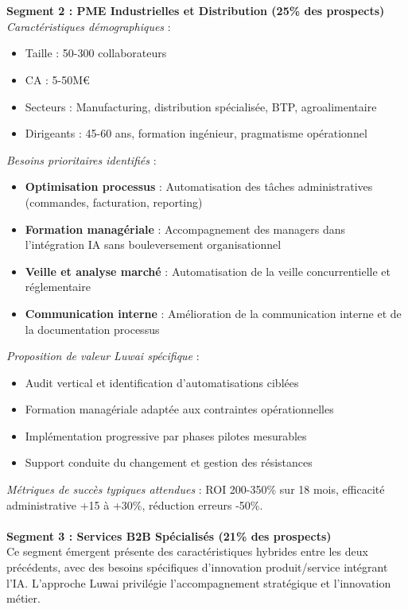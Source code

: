\\\\
\textbf{Segment 2 : PME Industrielles et Distribution (25\% des prospects)}\\
\emph{Caractéristiques démographiques} :
\begin{itemize}
    \item Taille : 50-300 collaborateurs
    \item CA : 5-50M€
    \item Secteurs : Manufacturing, distribution spécialisée, BTP, agroalimentaire
    \item Dirigeants : 45-60 ans, formation ingénieur, pragmatisme opérationnel
\end{itemize}
\medskip
\emph{Besoins prioritaires identifiés} :
\begin{itemize}
    \item \textbf{Optimisation processus} : Automatisation des tâches administratives (commandes, facturation, reporting)
    \item \textbf{Formation managériale} : Accompagnement des managers dans l'intégration IA sans bouleversement organisationnel
    \item \textbf{Veille et analyse marché} : Automatisation de la veille concurrentielle et réglementaire
    \item \textbf{Communication interne} : Amélioration de la communication interne et de la documentation processus
\end{itemize}
\medskip
\emph{Proposition de valeur Luwai spécifique} :
\begin{itemize}
    \item Audit vertical et identification d'automatisations ciblées
    \item Formation managériale adaptée aux contraintes opérationnelles
    \item Implémentation progressive par phases pilotes mesurables
    \item Support conduite du changement et gestion des résistances
\end{itemize}
\medskip
\emph{Métriques de succès typiques attendues} : ROI 200-350\% sur 18 mois, efficacité administrative +15 à +30\%, réduction erreurs -50\%.
\\\\
\textbf{Segment 3 : Services B2B Spécialisés (21\% des prospects)}\\
Ce segment émergent présente des caractéristiques hybrides entre les deux précédents, avec des besoins spécifiques d'innovation produit/service intégrant l'IA. L'approche Luwai privilégie l'accompagnement stratégique et l'innovation métier.

